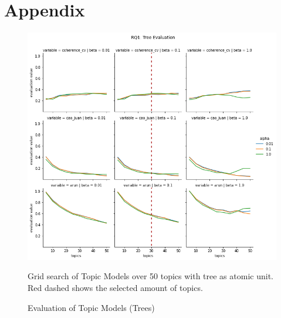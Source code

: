 \documentclass{article}
\begin{document}
    \section{Appendix}
    \begin{figure}[H]
        \begin{centering}
        \includegraphics[width = \textwidth]{../Figure/H1_tree_red.png}
        \caption{Evaluation of Topic Models (Trees)}
        \end{centering}
        \begin{footnotesize} 
            Grid search of Topic Models over 50 topics with tree as atomic unit. Red dashed shows the selected amount of topics.         \end{footnotesize}
    \end{figure}
\end{document}
